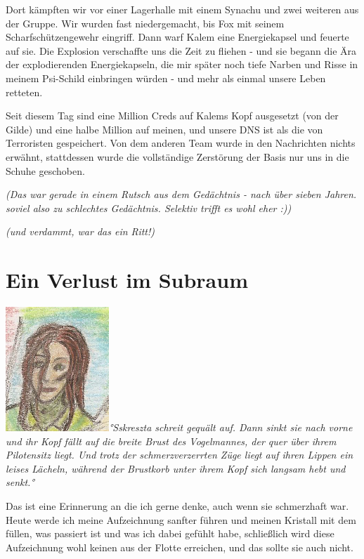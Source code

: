 \documentclass[11pt]{article}
\begin{document}
Dort kämpften wir vor einer Lagerhalle mit einem Synachu und zwei
weiteren aus der Gruppe. Wir wurden fast niedergemacht, bis Fox mit
seinem Scharfschützengewehr eingriff. Dann warf Kalem eine Energiekapsel
und feuerte auf sie. Die Explosion verschaffte uns die Zeit zu fliehen -
und sie begann die Ära der explodierenden Energiekapseln, die mir später
noch tiefe Narben und Risse in meinem Psi-Schild einbringen würden - und
mehr als einmal unsere Leben retteten.

Seit diesem Tag sind eine Million Creds auf Kalems Kopf ausgesetzt (von
der Gilde) und eine halbe Million auf meinen, und unsere DNS ist als die
von Terroristen gespeichert. Von dem anderen Team wurde in den
Nachrichten nichts erwähnt, stattdessen wurde die vollständige
Zerstörung der Basis nur uns in die Schuhe geschoben.

\emph{(Das war gerade in einem Rutsch aus dem Gedächtnis - nach über
sieben Jahren. soviel also zu schlechtes Gedächtnis. Selektiv trifft es
wohl eher :))}

\emph{(und verdammt, war das ein Ritt!)}

\section{Ein Verlust im Subraum}

\emph{\includegraphics{sskreszta-portrait-alt-klein.png}°Sskreszta
schreit gequält auf. Dann sinkt sie nach vorne und ihr Kopf fällt auf
die breite Brust des Vogelmannes, der quer über ihrem Pilotensitz liegt.
Und trotz der schmerzverzerrten Züge liegt auf ihren Lippen ein leises
Lächeln, während der Brustkorb unter ihrem Kopf sich langsam hebt und
senkt.°}

Das ist eine Erinnerung an die ich gerne denke, auch wenn sie
schmerzhaft war. Heute werde ich meine Aufzeichnung sanfter führen und
meinen Kristall mit dem füllen, was passiert ist und was ich dabei
gefühlt habe, schließlich wird diese Aufzeichnung wohl keinen aus der
Flotte erreichen, und das sollte sie auch nicht.
\end{document}
